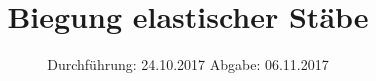 

\subject{Versuch 103}
\title{Biegung elastischer Stäbe}
\date{
  Durchführung: 24.10.2017
  \hspace{3em}
  Abgabe: 06.11.2017
}


    \maketitle
    \thispagestyle{empty}
    \tableofcontents
    \newpage
    
    
    
    
    
    \newpage
    
    
    \newpage
    
    \printbibliography{}

